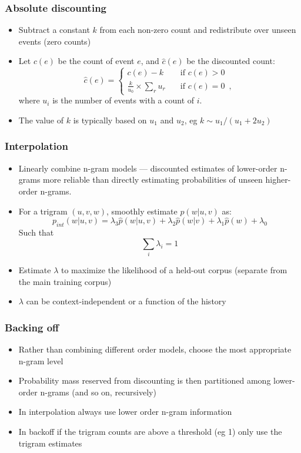 \begin{frame}
  \frametitle{Absolute discounting}
  \begin{itemize}
  \item<1-> Subtract a constant $k$ from each non-zero count and
    redistribute over unseen events (zero counts)
  \item<2-> Let $c(e)$ be the count of event $e$, and $\hat{c}(e)$ be the
    discounted count:
    \[
    \hat{c}(e) = \left\{ \begin{array}{ll}
        c(e) - k & \text{if } c(e) > 0 \\
        {\displaystyle \frac{k}{u_0}\times \sum_r u_r}\quad & \text{if } c(e) = 0 \enspace ,
        \end{array} \right.
      \]
      where $u_i$ is the number of events with a count of $i$.
    \item<2-> The value of $k$ is typically based on $u_1$ and $u_2$, eg
      $k \sim u_1 / (u_1 + 2u_2)$
  \end{itemize}
\end{frame}

\begin{frame}
  \frametitle{Interpolation}
  \begin{itemize}
  \item<1-> Linearly combine n-gram models --- discounted estimates of
    lower-order n-grams more reliable than directly estimating
    probabilities of unseen higher-order n-grams.  
  \item<2-> For a trigram $(u,v,w)$,
    smoothly estimate $p(w|u,v)$ as:
    \[ p_{int}(w|u,v) = \lambda_3 \hat{p}(w|u,v) +
    \lambda_2 \hat{p}(w|v) + \lambda_1 \hat{p}(w) + \lambda_0 \]
    Such that
    \[ \sum_i \lambda_i = 1 \]
  \item<3-> Estimate $\lambda$ to maximize the likelihood of a
    \alert{held-out} corpus  (separate from the main training corpus)
  \item<3-> $\lambda$ can be context-independent or a function of the
    history
  \end{itemize}
\end{frame}

\begin{frame}
  \frametitle{Backing off}
  \begin{itemize}
  \item Rather than combining different order models, choose the most
    appropriate n-gram level
  \item Probability mass reserved from discounting is then partitioned
    among lower-order n-grams (and so on, recursively)
  \item In interpolation always use lower order n-gram information
  \item In backoff if the trigram counts are above a threshold (eg 1)
    only use the trigram estimates
  \end{itemize}
\end{frame}

